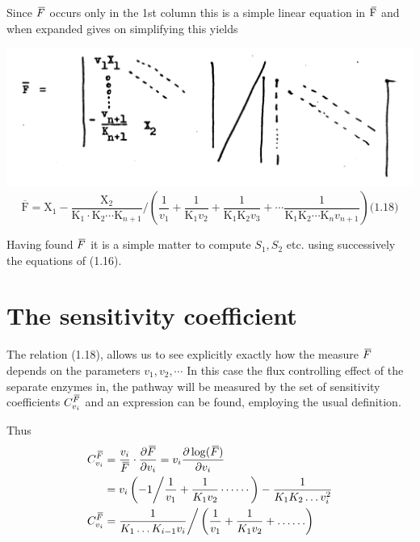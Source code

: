 %
Since $\,\overline{\!{F}}$ occurs only in the 1st column this is a simple linear equation in $\,\overline{\!{\mathrm{F}}}$ and when expanded gives on simplifying this yields
%

\includegraphics[scale=0.55]{figure1_17a.png}
%
$$
\overline{\mathrm{F}} = \mathrm{X}_1-\frac{\mathrm{X}_2}{\mathrm{K}_1 \cdot \mathrm{K}_2 \cdots \mathrm{K}_{n+1}} \bigg/
\left(\frac{1}{v_1} + \frac{1}{\mathrm{K}_1 v_2} + \frac{1}{\mathrm{K}_1 \mathrm{K}_2 v_3} +
\cdots \frac{1}{\mathrm{K}_1 \mathrm{K}_2 \cdots \mathrm{K}_n v_{n+1}}\right)  \mbox{(1.18)} $$

Having found $\,\overline{\!{F}}$ it is a simple matter to compute $S_{1}, S_{2}$ etc. using successively the equations of (1.16).

\section{The sensitivity coefficient}

The relation (1.18), allows us to see explicitly exactly how the measure $\,\overline{\!{F}}$ depends on the parameters $v_{1}, v_{2}, \cdots$ In this case the flux controlling effect of the separate enzymes in, the pathway will be measured by the set of sensitivity coefficients $C_{v_{i}}^{\,\overline{\!{F}}}$ and an expression can be found, employing the usual definition.

Thus
%
\begin{equation}
\begin{aligned}
C_{v_{i}}^{\,\overline{\!{F}}} &= \frac{v_{i}}{\,\overline{\!{F}}} \cdot \frac{\partial \,\overline{\!{F}}}{\partial v_{i}}=v_{i} \frac{\partial \log (\,\overline{\!{F}})}{\partial v_{i}} \\
&=v_{i} \left(-1 \bigg/ \frac{1}{v_{1}}+\frac{1}{K_{1} v_{2}} \cdots \cdots\right) -\frac{1}{K_{1} K_{2} \ldots v_{i}^{2}} \\
C_{v_{i}}^{\,\overline{\!{F}}} &=\frac{1}{K_{1} \ldots K_{i-1} v_{i}} \bigg/\left(\frac{1}{v_{1}}+\frac{1}{K_{1} v_{2}}+\ldots \ldots\right)
\end{aligned}
\label{eqn:119}
\end{equation}

